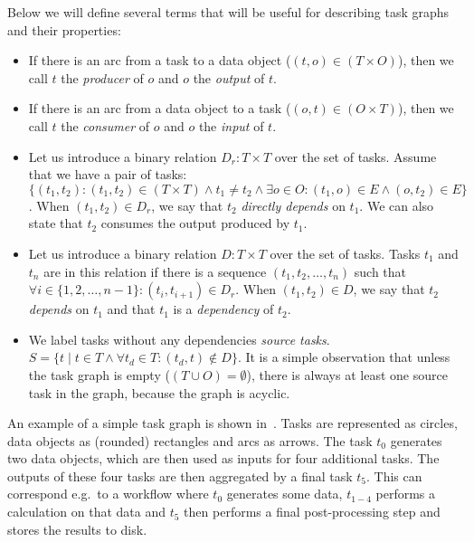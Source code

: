 Below we will define several terms that will be useful for describing task graphs and their
properties:
\begin{itemize}
	\item If there is an arc from a task to a data object ($(t,o) \in (T\times{}O)$), then we call
	      $t$ the \emph{producer} of $o$ and $o$
	      the \emph{output} of $t$.
	\item If there is an arc from a data object to a task ($(o,t) \in (O\times{}T)$), then we call
	      $t$ the \emph{consumer} of $o$ and $o$
	      the \emph{input} of $t$.

	\item Let us introduce a binary relation $D_r: T \times T$ over the set of tasks. Assume that we
	      have a pair of tasks: $\{(t_1, t_2)\colon (t_1, t_2)\in{}(T\times{}T)\land t_1 \neq t_2 \land
		      \exists{}o\in{}O\colon (t_1, o)\in{}E
		      \land (o, t_2)\in{}E\}$. When $(t_1, t_2) \in D_r$, we say that
	      $t_2$ \emph{directly depends} on $t_1$. We can also state that
	      $t_2$ consumes the output produced by $t_1$.

	\item Let us introduce a binary relation $D: T \times T$ over the set of tasks. Tasks
	      $t_1$ and $t_n$ are in this relation if there is a sequence
	      $(t_1, t_2, \ldots, t_n)$ such that $\forall i \in \{
		      1,2,\ldots,n - 1\}: (t_i, t_{i+1}) \in D_r$. When $(t_1, t_2) \in D$, we say that
	      $t_2$ \emph{depends} on $t_1$ and that
	      $t_1$ is a \emph{dependency} of $t_2$.

	\item We label tasks without any dependencies \emph{source tasks}. $S = \{ t \mid t\in{}T \land \forall{}t_d\in{}T:
		      (t_d, t)\notin D\}$. It is a
	      simple observation that unless the task graph is empty ($(T\cup{}O) = \emptyset$), there is always at
	      least one source task in the graph, because the graph is acyclic.
\end{itemize}


An example of a simple task graph is shown in~. Tasks are represented as
circles, data objects as (rounded) rectangles and arcs as arrows. The task $t_0$
generates two data objects, which are then used as inputs for four additional tasks. The outputs of
these four tasks are then aggregated by a final task $t_5$. This can correspond
e.g.\ to a workflow where $t_0$ generates some data, $t_{1-4}$
performs a calculation on that data and $t_5$ then performs a final
post-processing step and stores the results to disk.

